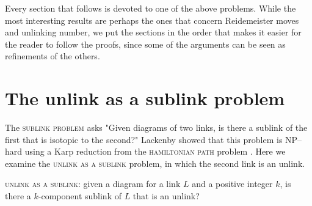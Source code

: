 \documentclass[12pt]{amsart}
\theoremstyle{definition}
\theoremstyle{remark}
\begin{document}
Every section that follows is devoted to one of the above problems.
While the most interesting results are perhaps the ones that concern Reidemeister moves and unlinking number, we put the sections in the order that makes it easier for the reader to follow the proofs, since some of the arguments can be seen as refinements of the others.

\section{The unlink as a sublink problem}
\label{sec_unlinksublink}

The \textsc{sublink problem} asks "Given diagrams of two links, is there a sublink of the first that is isotopic to the second?"  Lackenby showed that this problem is NP--hard using a Karp reduction from the \textsc{hamiltonian path} problem \cite{Lackenby1}.
Here we examine the \textsc{unlink as a sublink} problem, in which the second link is an unlink.

\vspace{0.14in}

\textsc{unlink as a sublink}: given a diagram for a link $L$ and a positive integer $k$, is there a $k$-component sublink of $L$ that is an unlink?
\end{document}
